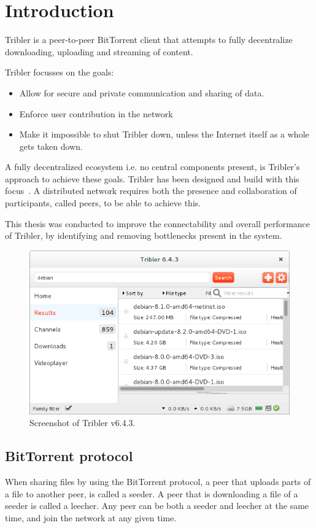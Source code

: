 \chapter{Introduction}
\label{chp:introduction}
Tribler is a peer-to-peer BitTorrent client that attempts to fully decentralize downloading, uploading and streaming of content.

Tribler focusses on the goals:
\begin{itemize}
    \item Allow for secure and private communication and sharing of data.
    \item Enforce user contribution in the network
    \item Make it impossible to shut Tribler down, unless the Internet itself as a whole gets taken down.
\end{itemize}

A fully decentralized ecosystem i.e. no central components present, is Tribler's approach to achieve these goals.
Tribler has been designed and build with this focus~\cite{Pouwelse-tribler,Bakker-tribler}.
A distributed network requires both the presence and collaboration of participants, called peers, to be able to achieve this.

This thesis was conducted to improve the connectability and overall performance of Tribler, by identifying and removing bottlenecks present in the system.

\begin{figure}
	\centerline{\includegraphics[scale=0.6]{introduction/figs/tribler-screenshot.png}}
	\caption{Screenshot of Tribler v6.4.3.}
	\label{fig:tribler-screenshot}
\end{figure}

\section{BitTorrent protocol}
When sharing files by using the BitTorrent protocol, a peer that uploads parts of a file to another peer, is called a seeder.
A peer that is downloading a file of a seeder is called a leecher.
Any peer can be both a seeder and leecher at the same time, and join the network at any given time.

